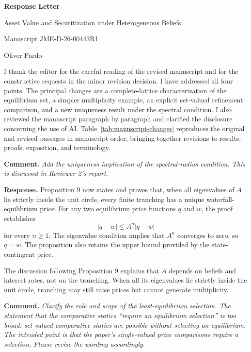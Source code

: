 \documentclass[11pt]{article}
\newcommand{\msnumber}{JME-D-26-00443R1}
\newcommand{\commenttext}[1]{\par\noindent\textbf{Comment.} \textit{#1}\par}
\newcommand{\response}[1]{\par\noindent\textbf{Response.} #1\par}
\begin{document}
\begin{center}
{\Large\bfseries Response Letter}\par
\vspace{0.5em}
{\large Asset Value and Securitization under Heterogeneous Beliefs}\par
\vspace{0.25em}
Manuscript \msnumber\par
\vspace{0.25em}
Oliver Pardo
\end{center}

\bigskip

I thank the editor for the careful reading of the revised manuscript and for the constructive requests in the minor revision decision. I have addressed all four points. The principal changes are a complete-lattice characterization of the equilibrium set, a simpler multiplicity example, an explicit set-valued refinement comparison, and a new uniqueness result under the spectral condition. I also reviewed the manuscript paragraph by paragraph and clarified the disclosure concerning the use of AI. Table~\ref{tab:manuscript-changes} reproduces the original and revised passages in manuscript order, bringing together revisions to results, proofs, exposition, and terminology.

\commenttext{Add the uniqueness implication of the spectral-radius condition. This is discussed in Reviewer 2's report.}

\response{Proposition 9 now states and proves that, when all eigenvalues of $A$ lie strictly inside the unit circle, every finite tranching has a unique waterfall-equilibrium price. For any two equilibrium price functions $q$ and $w$, the proof establishes
\[
|q-w|\leq A^n|q-w|
\]
for every $n\geq1$. The eigenvalue condition implies that $A^n$ converges to zero, so $q=w$. The proposition also retains the upper bound provided by the state-contingent price.

The discussion following Proposition 9 explains that $A$ depends on beliefs and interest rates, not on the tranching. When all its eigenvalues lie strictly inside the unit circle, tranching may still raise prices but cannot generate multiplicity.}

\commenttext{Clarify the role and scope of the least-equilibrium selection. The statement that the comparative statics ``require an equilibrium selection'' is too broad: set-valued comparative statics are possible without selecting an equilibrium. The intended point is that the paper's single-valued price comparisons require a selection. Please revise the wording accordingly.}
\end{document}

